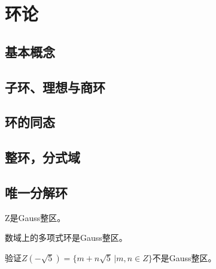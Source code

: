 \section{环论}
\subsection{基本概念}
\subsection{子环、理想与商环}
\subsection{环的同态}
\subsection{整环，分式域}
\subsection{唯一分解环}



\begin{example}
	Z是Gauss整区。	
\end{example}

\begin{example}
	数域上的多项式环是Gauss整区。
\end{example}

\begin{example}
	验证$Z(-\sqrt{5})=\{m+n\sqrt{5}\, \big| m,n\in Z\}$不是Gauss整区。
\end{example}

